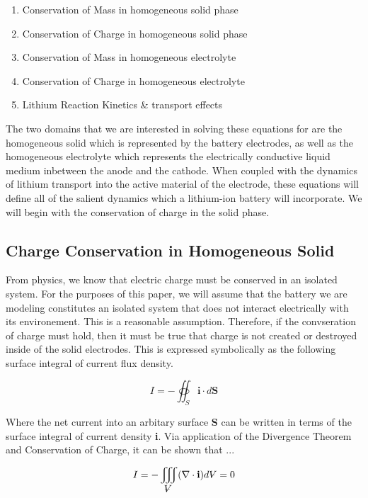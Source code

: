 \documentclass[lettersize,journal]{IEEEtran}
\newcommand{\volume}{{\ooalign{\hfil$V$\hfil\cr\kern0.08em--\hfil\cr}}}
\begin{document}
 \begin{enumerate}
   \item Conservation of Mass in homogeneous solid phase
   \item Conservation of Charge in homogeneous solid phase
   \item Conservation of Mass in homogeneous electrolyte
   \item Conservation of Charge in homogeneous electrolyte
   \item Lithium Reaction Kinetics \& transport effects\\
  \end{enumerate}

The two domains that we are interested in solving these equations for are the homogeneous solid which is represented by the battery electrodes, as well as the homogeneous electrolyte which represents the electrically conductive liquid medium inbetween the anode and the cathode. When coupled with the dynamics of lithium transport into the active material of the electrode, these equations will define all of the salient dynamics which a lithium-ion battery will incorporate. We will begin with the conservation of charge in the solid phase.

\subsection{Charge Conservation in Homogeneous Solid}

From physics, we know that electric charge must be conserved in an isolated system. For the purposes of this paper, we will assume that the battery we are modeling constitutes an isolated system that does not interact electrically with its environement. This is a reasonable assumption. Therefore, if the convseration of charge must hold, then it must be true that charge is not created or destroyed inside of the solid electrodes. This is expressed symbolically as the following surface integral of current flux density.

\begin{equation}
 I = - \oiint_S \textbf{i} \cdot d \textbf{S}
\end{equation}

\noindent Where the net current into an arbitary surface \textbf{S} can be written in terms of the surface integral of current density \textbf{i}. Via application of the Divergence Theorem and Conservation of Charge, it can be shown that ...

\begin{equation}
    I = - \iiint_{\volume} (\nabla \cdot \textbf{i})d{\volume} = 0
\end{equation}
\end{document}
